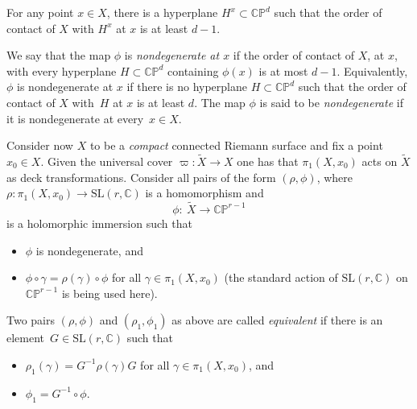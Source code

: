 \documentclass[pdftex]{sigma}
\numberwithin{equation}{section}
\begin{document}
For any point $x \in X$, there is a hyperplane $H^x \subset {\mathbb C}{\mathbb
P}^d$ such that the order of contact of $X$ with $H^x$ at $x$ is at least $d-1$.

\begin{Definition}We say that the map $\phi$ is \textit{nondegenerate at $x$} if the order of contact of $X$,
at $x$, with every hyperplane $H \subset {\mathbb C}{\mathbb P}^d$ containing $\phi(x)$
is at most $d-1$. Equivalently, $\phi$ is nondegenerate at $x$ if there is
no hyperplane $H \subset {\mathbb C}{\mathbb P}^d$ such that the
order of contact of $X$ with~$H$ at $x$ is at least $d$.
The map $\phi$ is said to be \textit{nondegenerate} if it is nondegenerate at every~$x \in X$.
\end{Definition}

Consider now $X$ to be a {\it compact} connected Riemann surface and fix a point $x_0 \in X$.
Given the universal cover
$
\varpi\colon \widetilde{X} \longrightarrow X
$
 one has that $\pi_1(X, x_0)$ acts on
$\widetilde{X}$ as deck transformations. Consider all pairs of the form
$(\rho, \phi)$, where
$
\rho\colon \pi_1(X, x_0) \longrightarrow \text{SL}(r, {\mathbb C})
$
is a homomorphism and
\[
\phi\colon\ \widetilde{X} \longrightarrow {\mathbb C}{\mathbb P}^{r-1}
\]
is a holomorphic immersion such that
\begin{itemize}\itemsep=0pt
\item[(1)] $\phi$ is nondegenerate, and

\item[(2)] $\phi\circ\gamma = \rho(\gamma)\circ\phi$ for all $\gamma \in
\pi_1(X, x_0)$ (the standard action of $\text{SL}(r, {\mathbb C})$
on ${\mathbb C}{\mathbb P}^{r-1}$ is being used here).
\end{itemize}

\begin{Definition}\label{space}Two pairs $(\rho, \phi)$ and $(\rho_1, \phi_1)$ as above are
 called \textit{equivalent} if there is an element~$G \in
\text{SL}(r, {\mathbb C})$ such that
\begin{itemize}\itemsep=0pt
\item[(1)] $\rho_1(\gamma) = G^{-1}\rho(\gamma) G$ for all
$\gamma \in \pi_1(X, x_0)$, and

\item[(2)] $\phi_1 = G^{-1}\circ\phi$.
\end{itemize}
\end{Definition}
\end{document}
